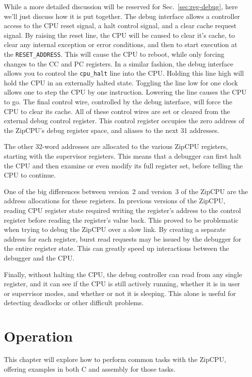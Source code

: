 \documentclass{gqtekspec}
\begin{document}
While a more detailed discussion will be reserved for Sec.~\ref{sec:reg-debug},
here we'll just discuss how it is put together.  The debug interface allows
a controller access to the CPU reset signal, a halt control signal, and a
clear cache request signal.  By raising the reset line, the CPU will be caused
to clear it's cache, to clear any internal exception or error conditions, and
then to start execution at the {\tt RESET\_ADDRESS}.  This will cause the
CPU to reboot, while only forcing changes to the CC and PC registers.  In a
similar fashion, the debug interface allows you to control the {\tt cpu\_halt}
line into the CPU.  Holding this line high will hold the CPU in an externally
halted state.  Toggling the line low for one clock allows one to step the CPU
by one instruction.  Lowering the line causes the CPU to go.  The final control
wire, controlled by the debug interface, will force the CPU to clear its cache.
All of these control wires are set or cleared from the external debug control
register.  This control register occupies the zero address of the
ZipCPU's debug register space, and aliases to the next 31 addresses.

The other 32-word addresses are allocated to the various ZipCPU registers,
starting with the supervisor registers.  This means that a debugger can first
halt the CPU and then examine or even modify its full register set, before
telling the CPU to continue.

One of the big differences between version~2 and version~3 of the ZipCPU
are the address allocations for these registers.  In previous versions of
the ZipCPU, reading CPU register state required writing the register's
address to the control register before reading the register's value back.
This proved to be problematic when trying to debug the ZipCPU over a slow
link.  By creating a separate address for each register, burst read requests
may be issued by the debugger for the entire register state.  This can
greatly speed up interactions between the debugger and the CPU.

Finally, without halting the CPU, the debug controller can read from any
single register, and it can see if the CPU is still actively running, whether
it is in user or supervisor modes, and whether or not it is sleeping.  This
alone is useful for detecting deadlocks or other difficult problems.
\chapter{Operation}\label{chap:ops}
This chapter will explore how to perform common tasks with the ZipCPU,
offering examples in both C and assembly for those tasks.
\end{document}
